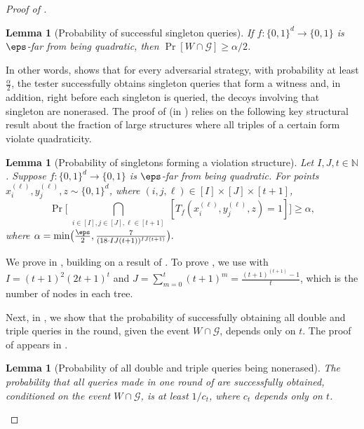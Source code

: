\documentclass[11pt]{article}
\numberwithin{equation}{section}
\newtheorem{lemma}[theorem]{Lemma}
\theoremstyle{definition}
\theoremstyle{plain}
\begin{document}
\begin{proof}[Proof of ]
 \begin{lemma}[Probability of successful singleton queries]\label{lem:witness} If $f\colon \{0,1\}^d\to\{0,1\}$ is $\eps$-far from being quadratic, then $\Pr[W \cap \mathcal{G}] \geq \alpha/2$. 
\end{lemma}

 
In other words,  shows that for every adversarial strategy, with probability at least  $\frac{\alpha}{2}$,  the tester successfully obtains singleton queries that form a witness and, in addition, right before each singleton is queried, the decoys involving that singleton are nonerased. The proof of  (in ) relies on the following key structural result about the fraction of large structures where all triples of a certain form violate quadraticity. %
 
\begin{lemma}[Probability of singletons forming a violation structure]\label{lem:quadratic_t}
    Let $I,J,t\in{\mathbb{N}}$.
	Suppose $f \colon \{0,1\}^d\to \{0,1\}$ is $\eps$-far from being quadratic. For points $x_i^{(\ell)}, y_{j}^{(\ell)}, z \sim \{0,1\}^d$, where $(i,j,\ell) \in [I]\times[J]\times[t+1]$,
 	\begin{equation}\label{eq:violation}
 	    	\Pr\biggl[ \bigcap_{\substack{i \in [I], j\in [J], \ell \in [t+1]}} [T_f(x_i^{(\ell)}, y_{j}^{(\ell)}, z) = 1] \biggr] \geq \alpha, 
 	\end{equation}
 	where $\alpha= \min \bigl( \frac{\eps}{2}, \frac{7}{(18 \cdot IJ(t+1))^{I J (t+1)}} \bigr).$
\end{lemma}



We prove  in , building on a result of \cite{AlonKKLR05}. To prove , we use  with $I = (t+1)^2(2t+1)^t$ and $J = \sum_{m=0}^{t}(t+1)^m = \frac{(t+1)^{(t+1)}-1}{t}$, which is the number of nodes in each tree. 



Next, in , we show that the probability of successfully obtaining all double and triple queries in the round, given the event $W\cap \mathcal{G}$, depends only on $t$. The proof of  appears in  .
 \begin{lemma}[Probability of all double and triple queries being nonerased]\label{lem:erasures}
The probability that all queries made in one round of  are successfully obtained, conditioned on the event $W \cap \mathcal{G}$, is at least $1/c_t$, where $c_t$ depends only on $t$.
\end{lemma}


\end{proof}
\end{document}
